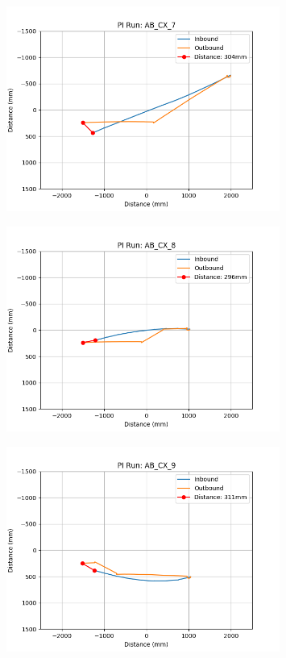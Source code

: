 \documentclass[a4paper,11pt,twoside,openright]{article}
\begin{document}
\begin{figure}[h!]
  \centering
  \includegraphics[width=0.8\textwidth]{AB_CX_7}
  \caption{\label{fig:abcx7}}
\end{figure}

\begin{figure}[h!]
  \centering
  \includegraphics[width=0.8\textwidth]{AB_CX_8}
  \caption{\label{fig:abcx8}}
\end{figure}

\begin{figure}[h!]
  \centering
  \includegraphics[width=0.8\textwidth]{AB_CX_9}
  \caption{\label{fig:abcx9}}
\end{figure}
\end{document}
